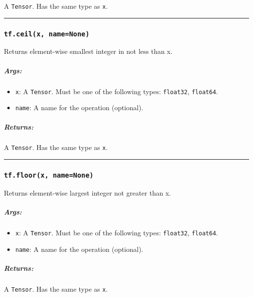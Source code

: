 A \texttt{Tensor}. Has the same type as \texttt{x}.

\begin{center}\rule{0.5\linewidth}{\linethickness}\end{center}

\subsubsection{\texorpdfstring{\texttt{tf.ceil(x,\ name=None)}
}{tf.ceil(x, name=None) }}\label{tf.ceilx-namenone}

Returns element-wise smallest integer in not less than x.

\subparagraph{Args: }\label{args-17}

\begin{itemize}
\tightlist
\item
  \texttt{x}: A \texttt{Tensor}. Must be one of the following types:
  \texttt{float32}, \texttt{float64}.
\item
  \texttt{name}: A name for the operation (optional).
\end{itemize}

\subparagraph{Returns: }\label{returns-17}

A \texttt{Tensor}. Has the same type as \texttt{x}.

\begin{center}\rule{0.5\linewidth}{\linethickness}\end{center}

\subsubsection{\texorpdfstring{\texttt{tf.floor(x,\ name=None)}
}{tf.floor(x, name=None) }}\label{tf.floorx-namenone}

Returns element-wise largest integer not greater than x.

\subparagraph{Args: }\label{args-18}

\begin{itemize}
\tightlist
\item
  \texttt{x}: A \texttt{Tensor}. Must be one of the following types:
  \texttt{float32}, \texttt{float64}.
\item
  \texttt{name}: A name for the operation (optional).
\end{itemize}

\subparagraph{Returns: }\label{returns-18}

A \texttt{Tensor}. Has the same type as \texttt{x}.

